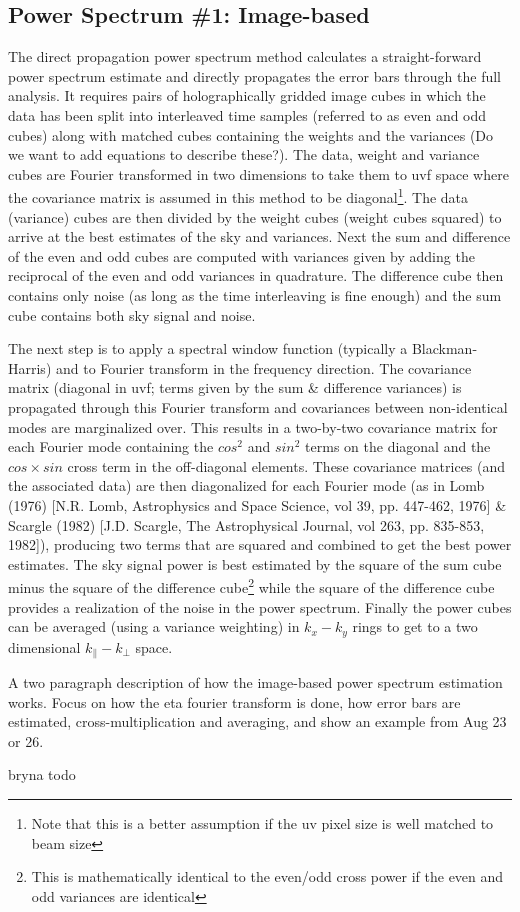 \subsection{Power Spectrum \#1: Image-based}
The direct propagation power spectrum method calculates a straight-forward power spectrum estimate and directly propagates the error bars through the full analysis. It requires pairs of holographically gridded image cubes in which the data has been split into interleaved time samples (referred to as even and odd cubes) along with matched cubes containing the weights and the variances (Do we want to add equations to describe these?).  The data, weight and variance cubes are Fourier transformed in two dimensions to take them to uvf space where the covariance matrix is assumed in this method to be diagonal\footnote{Note that this is a better assumption if the uv pixel size is well matched to beam size}. The data (variance) cubes are then divided by the weight cubes (weight cubes squared) to arrive at the best estimates of the sky and variances. Next the sum and difference of the even and odd cubes are computed with variances given by adding the reciprocal of the even and odd variances in quadrature. The difference cube then contains only noise (as long as the time interleaving is fine enough) and the sum cube contains both sky signal and noise.

The next step is to apply a spectral window function (typically a Blackman-Harris) and to Fourier transform in the frequency direction. The covariance matrix (diagonal in uvf; terms given by the sum & difference variances) is propagated through this Fourier transform and covariances between non-identical modes are marginalized over. This results in a two-by-two covariance matrix for each Fourier mode containing the $cos^2$ and $sin^2$ terms on the diagonal and the $cos\times sin$ cross term in the off-diagonal elements. These covariance matrices (and the associated data) are then diagonalized for each Fourier mode (as in Lomb (1976) [N.R. Lomb, Astrophysics and Space Science, vol 39, pp. 447-462, 1976] & Scargle (1982) [J.D. Scargle, The Astrophysical Journal, vol 263, pp. 835-853, 1982]), producing two terms that are squared and combined to get the best power estimates. The sky signal power is best estimated by the square of the sum cube minus the square of the difference cube\footnote{This is mathematically identical to the even/odd cross power if the even and odd variances are identical} while the square of the difference cube provides a realization of the noise in the power spectrum. Finally the power cubes can be averaged (using a variance weighting) in $k_x-k_y$ rings to get to a two dimensional $k_{\|}-k_{\bot}$ space.


A two paragraph description of how the image-based power spectrum estimation works. Focus on how the eta fourier transform is done, how error bars are estimated, cross-multiplication and averaging, and show an example from Aug 23 or 26.

bryna todo